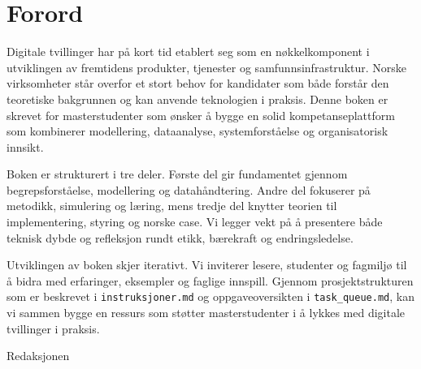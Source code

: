 \chapter*{Forord}

Digitale tvillinger har på kort tid etablert seg som en nøkkelkomponent i utviklingen av fremtidens produkter, tjenester og samfunnsinfrastruktur. Norske virksomheter står overfor et stort behov for kandidater som både forstår den teoretiske bakgrunnen og kan anvende teknologien i praksis. Denne boken er skrevet for masterstudenter som ønsker å bygge en solid kompetanseplattform som kombinerer modellering, dataanalyse, systemforståelse og organisatorisk innsikt.

Boken er strukturert i tre deler. Første del gir fundamentet gjennom begrepsforståelse, modellering og datahåndtering. Andre del fokuserer på metodikk, simulering og læring, mens tredje del knytter teorien til implementering, styring og norske case. Vi legger vekt på å presentere både teknisk dybde og refleksjon rundt etikk, bærekraft og endringsledelse.

Utviklingen av boken skjer iterativt. Vi inviterer lesere, studenter og fagmiljø til å bidra med erfaringer, eksempler og faglige innspill. Gjennom prosjektstrukturen som er beskrevet i \texttt{instruksjoner.md} og oppgaveoversikten i \texttt{task\_queue.md}, kan vi sammen bygge en ressurs som støtter masterstudenter i å lykkes med digitale tvillinger i praksis.

\bigskip
\begin{flushright}
Redaksjonen
\end{flushright}
